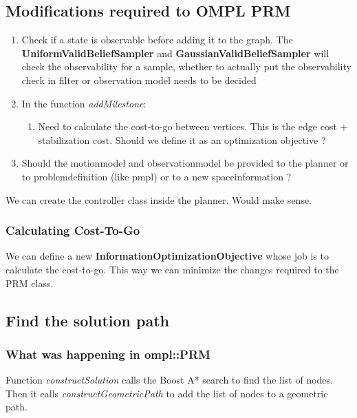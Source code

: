 \subsection{Modifications required to OMPL PRM}

\begin{enumerate}

 \item Check if a state is observable before adding it to the graph. The \textbf{UniformValidBeliefSampler} and   \textbf{GaussianValidBeliefSampler} will check the observability for a sample, whether to actually put the observability check in filter or observation model needs to be decided
   
 \item In the function \textit{addMilestone}:
  \begin{enumerate}
   \item Need to calculate the cost-to-go between vertices. This is the edge cost + stabilization cost. Should we define it as an optimization objective ?
  \end{enumerate}

  \item Should the motionmodel and observationmodel be provided to the planner or to problemdefinition (like pmpl) or to a new spaceinformation ?
\end{enumerate}

We can create the controller class inside the planner. Would make sense.

\subsubsection{Calculating Cost-To-Go}

We can define a new \textbf{InformationOptimizationObjective} whose job is to calculate the cost-to-go. This way we can minimize the changes required to the PRM
class.

\subsection{Find the solution path}

\subsubsection{What was happening in ompl::PRM}
Function \textit{constructSolution} calls the Boost A* search to find the list of nodes. Then it calls \textit{constructGeometricPath} to add the list of nodes
to a geometric path.


